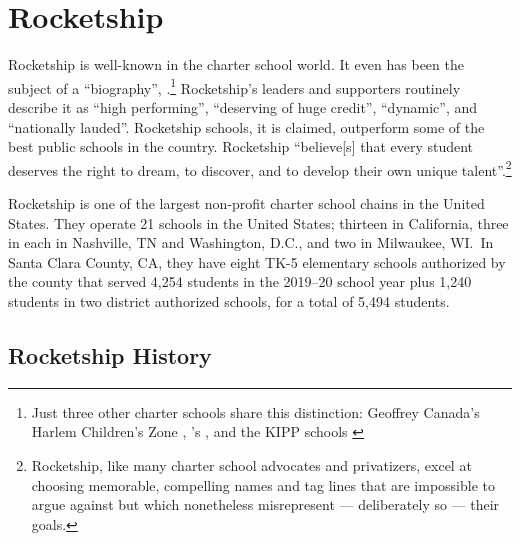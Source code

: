 \section{Rocketship}\label{sec:rocketship}\indent

Rocketship is well-known in the charter school world. It even has been the subject of a ``biography'',  \parencite{Whitmire2014}.\footnote{Just three other charter schools share this distinction: Geoffrey Canada's Harlem Children's Zone \parencite{Tough2009}, \citeauthor{Jacobs2007}'s , and the KIPP schools \parencite{Horn2016, Matthews2009}}  Rocketship's leaders and supporters routinely describe it as ``high performing'', ``deserving of huge credit'', ``dynamic'', and ``nationally lauded''. Rocketship schools, it is claimed, outperform some of the best public schools in the country. Rocketship ``believe[s] that every student deserves the right to dream, to discover, and to develop their own unique talent''.\footnote{Rocketship, like many charter school advocates and privatizers, excel at choosing memorable, compelling names and tag lines that are impossible to argue against but which nonetheless misrepresent — deliberately so — their goals.}

Rocketship is one of the largest non-profit charter school chains in the United States. They operate 21 schools in the United States; thirteen in California, three in each in Nashville, TN and Washington, D.C., and two in Milwaukee, WI.~In Santa Clara County, CA, they have eight TK-5 elementary schools authorized by the county that served 4,254 students in the 2019–20 school year plus 1,240 students in two district authorized schools, for a total of 5,494 students.

\subsection{Rocketship History}\label{sec:history}\indent

